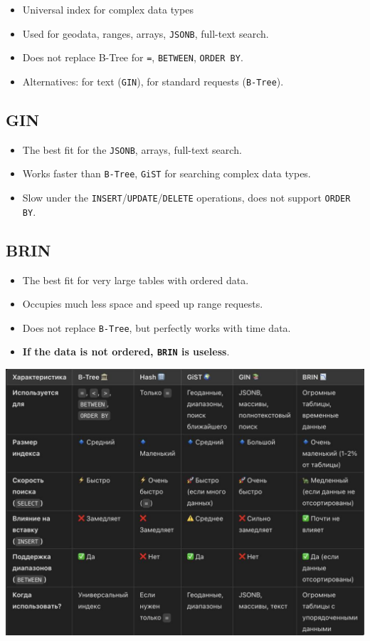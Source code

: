 \documentclass{article}
\newcommand{\code}[1]{\colorbox{light-gray}{\texttt{#1}}}
\begin{document}
\begin{itemize}
  \item Universal index for complex data types 
  \item Used for geodata, ranges, arrays, \code{JSONB}, full-text search.
  \item Does not replace B-Tree for \code{=}, \code{BETWEEN}, \code{ORDER BY}.
  \item Alternatives: for text (\code{GIN}), for standard requests (\code{B-Tree}).
\end{itemize}

\subsection{GIN}
\noindent

\begin{itemize}
  \item The best fit for the \code{JSONB}, arrays, full-text search.
  \item Works faster than \code{B-Tree}, \code{GiST} for searching complex data types.
  \item Slow under the \code{INSERT}/\code{UPDATE}/\code{DELETE} operations, does not support \code{ORDER BY}.
\end{itemize}

\subsection{BRIN}
\noindent

\begin{itemize}
  \item The best fit for very large tables with ordered data.
  \item Occupies much less space and speed up range requests.
  \item Does not replace \code{B-Tree}, but perfectly works with time data.
  \item \textbf{If the data is not ordered, \code{BRIN} is useless}. 
\end{itemize}

\includegraphics[width=\textwidth]{../attachments/indexes.jpg}
\end{document}
